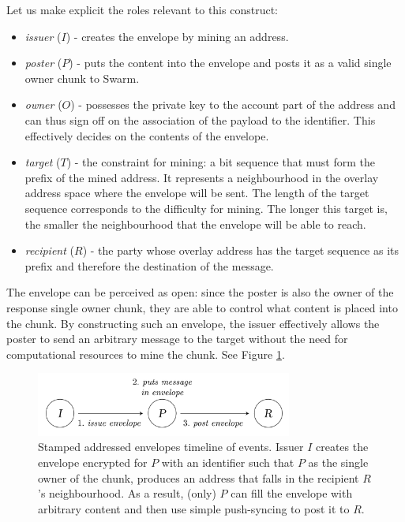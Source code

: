 Let us make explicit the roles relevant to this construct:

\begin{itemize}[noitemsep]
\item \emph{issuer} ($I$) - creates the envelope by mining an address. 
\item \emph{poster} ($P$) - puts the content into the envelope and posts it as a valid single owner chunk to Swarm.
\item \emph{owner} ($O$) - possesses the private key to the account part of the address and can thus sign off on the association of the payload to the identifier. This effectively decides on the contents of the envelope.
\item \emph{target} ($T$) - the constraint for mining: a bit sequence that must form the prefix of the mined address. It represents a neighbourhood in the overlay address space where the envelope will be sent. The length of the target sequence corresponds to the difficulty for mining. The longer this target is, the smaller the neighbourhood that the envelope will be able to reach.
\item \emph{recipient} ($R$) - the party whose overlay address has the target sequence as its prefix and therefore the destination of the message.
\end{itemize}

The envelope can be perceived as open: since the poster is also the owner of the response single owner chunk, they are able to control what content is placed into the chunk. By constructing such an envelope, the issuer effectively allows the poster to send an arbitrary message to the target without the need for computational resources to mine the chunk. See Figure \ref{fig:addressed-envelope-events}. 


\begin{figure}[htbp]
   \centering
   \includegraphics[width=0.75\textwidth]{fig/prepaid-addressed-envelopes-events.pdf}
   \caption[Stamped addressed envelope's timeline of events \statusgreen]{Stamped addressed envelopes timeline of events. Issuer $I$ creates the envelope encrypted for $P$ with an identifier such that $P$ as the single owner of the chunk, produces an address that falls in the recipient $R$'s neighbourhood. As a result, (only) $P$ can fill the envelope with arbitrary content and then use simple push-syncing to post it to $R$.}
   \label{fig:addressed-envelope-events}
\end{figure}

